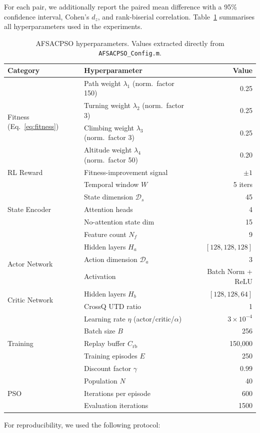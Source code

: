 \documentclass[final,5p,times]{elsarticle}
\begin{document}
For each pair, we additionally report the paired mean difference with a 95\% confidence interval, Cohen's $d_z$, and rank-biserial correlation. Table~\ref{tab:hyperparams} summarises all hyperparameters used in the experiments. \begin{table}[htbp]
\centering
\small
\caption{AFSACPSO hyperparameters. Values extracted directly from \texttt{AFSACPSO\_Config.m}.}
\label{tab:hyperparams}
\begin{tabularx}{\columnwidth}{lXr}
\hline
\textbf{Category} & \textbf{Hyperparameter} & \textbf{Value} \\
\hline
\multirow{4}{*}{Fitness (Eq.~\ref{eq:fitness})} & Path weight $\lambda_1$ (norm.~factor 150) & 0.25 \\ & Turning weight $\lambda_2$ (norm.~factor 3) & 0.25 \\ & Climbing weight $\lambda_3$ (norm.~factor 3) & 0.25 \\ & Altitude weight $\lambda_4$ (norm.~factor 50) & 0.20 \\
\hline
\multirow{1}{*}{RL Reward} & Fitness-improvement signal & $\pm 1$ \\
\hline
\multirow{5}{*}{State Encoder} & Temporal window $W$ & 5 iters \\ & State dimension $\mathcal{D}_s$ & 45 \\ & Attention heads & 4 \\ & No-attention state dim & 15 \\ & Feature count $N_f$ & 9 \\
\hline
\multirow{3}{*}{Actor Network} & Hidden layers $H_a$ & $[128, 128, 128]$ \\ & Action dimension $\mathcal{D}_a$ & 3 \\ & Activation & Batch Norm + ReLU \\
\hline
\multirow{2}{*}{Critic Network} & Hidden layers $H_b$ & $[128, 128, 64]$ \\ & CrossQ UTD ratio & 1 \\
\hline
\multirow{5}{*}{Training} & Learning rate $\eta$ (actor/critic/$\alpha$) & $3{\times}10^{-4}$ \\ & Batch size $B$ & 256 \\ & Replay buffer $C_{\text{rb}}$ & 150{,}000 \\ & Training episodes $E$ & 250 \\ & Discount factor $\gamma$ & 0.99 \\
\hline
\multirow{3}{*}{PSO} & Population $N$ & 40 \\ & Iterations per episode & 600 \\ & Evaluation iterations & 1500 \\
\hline
\end{tabularx}
\end{table} For reproducibility, we used the following protocol:
\end{document}

